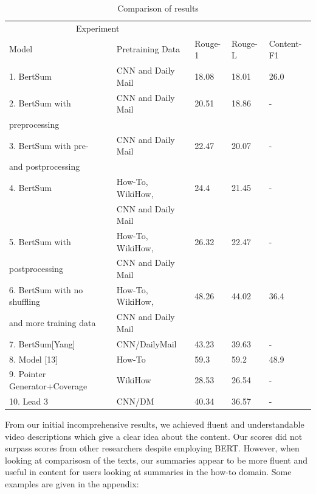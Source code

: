 \documentclass{article}
\begin{document}
\begin{table}[H]
\caption{Comparison of results}
\label{table1}
\centering
\begin{tabular}{lllll}
\toprule
\multicolumn{2}{c}{Experiment} \\
\cmidrule(r){1-2}
Model & Pretraining Data & Rouge-1 &Rouge-L &Content-F1\\
\midrule
1. BertSum & CNN and Daily Mail &18.08 &18.01 & 26.0 \\
\midrule
2. BertSum with & CNN and Daily Mail & 20.51 &18.86 & - \\
preprocessing & & \\
\midrule
3. BertSum with pre- & CNN and Daily Mail & 22.47&20.07 & - \\
and postprocessing & & \\
\midrule
4. BertSum & How-To, WikiHow, & 24.4 &21.45 & - \\
& CNN and Daily Mail&\\
\midrule
5. BertSum with & How-To, WikiHow, & 26.32 &22.47 & - \\
postprocessing &CNN and Daily Mail &\\
\midrule
6. BertSum with no shuffling& How-To, WikiHow, & 48.26 &44.02 & 36.4 \\
and more training data &CNN and Daily Mail &\\
\midrule
\midrule
7. BertSum[Yang] & CNN/DailyMail & 43.23 &39.63 & - \\
\midrule
8. Model [13] & How-To & 59.3 &59.2 & 48.9 \\
\midrule
9. Pointer Generator+Coverage& WikiHow & 28.53 &26.54 & - \\
\midrule
10. Lead 3 & CNN/DM & 40.34 &36.57 & - \\
\bottomrule
\end{tabular}
\end{table}


From our initial incomprehensive results, we achieved fluent and understandable video descriptions which give a clear idea about the content. Our scores did not surpass scores from other researchers despite employing BERT. However, when looking at comparisosn of the texts, our summaries appear to be more fluent and useful in content for users looking at summaries in the how-to domain. Some examples are given in the appendix:
\end{document}
